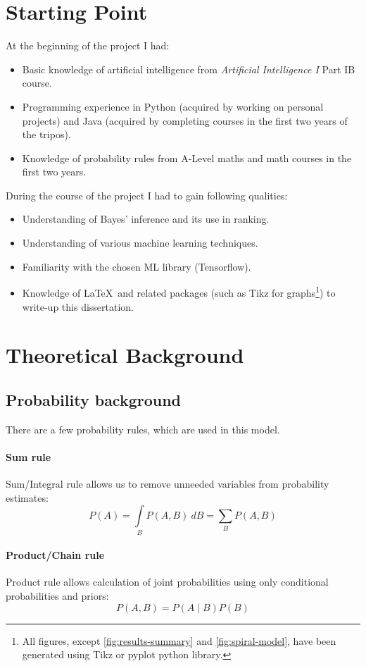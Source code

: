 \documentclass[12pt,a4paper]{book}
\begin{document}
\section{Starting Point}
\noindent
At the beginning of the project I had:
\begin{itemize}
\item Basic knowledge of artificial intelligence from \emph{Artificial Intelligence I} Part IB course.
\item Programming experience in Python (acquired by working on personal projects) and Java (acquired by completing courses in the first two years of the tripos).
\item Knowledge of probability rules from A-Level maths and math courses in the first two years.
\end{itemize}
During the course of the project I had to gain following qualities:
\begin{itemize}
\item Understanding of Bayes' inference and its use in ranking.
\item Understanding of various machine learning techniques.
\item Familiarity with the chosen ML library (Tensorflow).
\item Knowledge of \LaTeX\ and related packages (such as Tikz for graphs\footnote{All figures, except \ref{fig:results-summary} and \ref{fig:spiral-model}, have been generated using Tikz or pyplot python library.}) to write-up this dissertation.
\end{itemize}
\section{Theoretical Background}
\subsection{Probability background}
There are a few probability rules, which are used in this model.
\paragraph{Sum rule}
Sum/Integral rule allows us to remove unneeded variables from probability estimates:
\begin{equation*}
P(A) = \int\limits_{B}P(A,B)\ dB = \sum\limits_{B}P(A,B)
\end{equation*}
\paragraph{Product/Chain rule}
Product rule allows calculation of joint probabilities using only conditional probabilities and priors:
\begin{equation*}
P(A,B) = P(A\mid B)P(B)
\end{equation*} 
\end{document}
